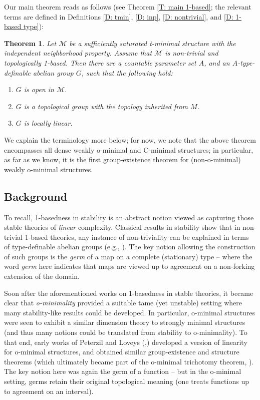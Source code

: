 \documentclass{amsart}
\newtheorem{introtheorem}{Theorem}
\theoremstyle{definition}
\begin{document}
Our main theorem reads as follows (see Theorem \ref{T: main 1-based}; the relevant terms are defined in Definitions \ref{D: tmin}, \ref{D: inp}, \ref{D: nontrivial}, and \ref{D: 1-based type}):

\begin{introtheorem}\label{T: main intro}
    Let $\mathcal M$ be a sufficiently saturated t-minimal structure with the independent neighborhood property. Assume that $\mathcal M$ is non-trivial and topologically 1-based. Then there are a countable parameter set $A$, and an $A$-type-definable abelian group $G$, such that the following hold:
    \begin{enumerate}
        \item $G$ is open in $\mathcal M$.
        \item $G$ is a topological group with the topology inherited from $M$.
        \item $G$ is locally linear.
    \end{enumerate}
\end{introtheorem}

We explain the terminology more below; for now, we note that the above theorem encompasses all dense weakly o-minimal and C-minimal structures; in particular, as far as we know, it is the first group-existence theorem for (non-o-minimal) weakly o-minimal structures.


\subsection{Background} To recall, 1-basedness in stability is an abstract notion viewed as capturing those stable theories of \textit{linear} complexity. Classical results in stability show that in non-trivial 1-based theories, any instance of non-triviality can be explained in terms of type-definable abelian groups (e.g., \cite[Corollary 5.4.13]{PillayBook}). The key notion allowing the construction of such groups is the \textit{germ} of a map on a complete (stationary) type -- where the word \textit{germ} here indicates that maps are viewed up to agreement on a non-forking extension of the domain.

Soon after the aforementioned works on 1-basedness in stable theories, it became clear that \textit{o-minimality} provided a suitable tame (yet unstable) setting where many stability-like results could be developed. In particular, o-minimal structures were seen to exhibit a similar dimension theory to strongly minimal structures (and thus many notions could be translated from stability to o-minimality). To that end, early works of Peterzil and Loveys (\cite{Pe},\cite{LovPet}) developed a version of linearity for o-minimal structures, and obtained similar group-existence and structure theorems (which ultimately became part of the o-minimal trichotomy theorem, \cite{PeStTricho}). The key notion here was again the germ of a function -- but in the o-minimal setting, germs retain their original topological meaning (one treats functions up to agreement on an interval).
\end{document}
